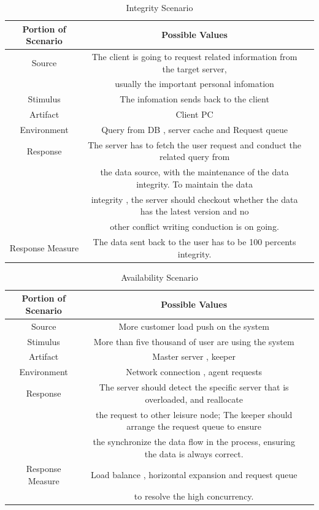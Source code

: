 \documentclass{article}
\begin{document}
	\begin{center}
		\begin{table}[!htb]
		\begin{tabular}{ccc}
		\toprule  
		Portion of Scenario & Possible Values\\
		\midrule 
		Source 	& The client is going to request related information from the target server, \\
		& usually the important personal infomation\\
		Stimulus & The infomation sends back to the client\\
		Artifact & Client PC	\\
		Environment & Query from DB , server cache and Request queue\\
		Response & The server has to fetch the user request and conduct the related query from \\
		& the data source, with the maintenance of the data integrity. To maintain the data \\
		& integrity , the server should checkout whether the data has the latest version and no \\
		& other conflict writing conduction is on going.\\
		Response Measure 	& The data sent back to the user has to be 100 percents integrity.\\
		\bottomrule
		\end{tabular}
		\caption{Integrity Scenario}
		\end{table}
	\end{center}
	
	\begin{center}
		\begin{table}[!htb]
		\begin{tabular}{ccc}
		\toprule  
		Portion of Scenario & Possible Values\\
		\midrule 
		Source 				& More customer load push on the system\\
		Stimulus 			& More than five thousand of user are using the system\\
		Artifact 			& Master server , keeper\\
		Environment 		& Network connection , agent requests \\
		Response & The server should detect the specific server that is overloaded, and reallocate \\
		& the request to other leisure node; The keeper should arrange the request queue to ensure \\
		& the synchronize the data flow in the process, ensuring the data is always correct.\\
		Response Measure & Load balance , horizontal expansion and request queue \\
		& to resolve the high concurrency.\\
		\bottomrule
		\end{tabular}
		\caption{Availability Scenario}
		\end{table}
	\end{center}
\end{document}
